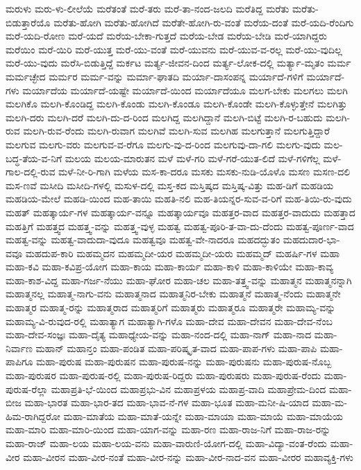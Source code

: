 {ಮರುಳು
ಮರು-ಳು-ಲೀಲೆಯೆ
ಮರೆತಂತೆ
ಮರೆ-ತರು
ಮರೆ-ತಾ-ನಂದ-ಜಲದಿ
ಮರೆತಿದ್ದ
ಮರೆತು
ಮರೆತು-ಬಿಡುತ್ತಾರೆಯೊ
ಮರೆತು-ಹೋಗಿ
ಮರೆತು-ಹೋಗಿದೆ
ಮರೆತೇ-ಹೋಗಿ-ರು-ವಂತೆ
ಮರೆಯ-ದಂತೆ
ಮರೆ-ಯದಿ-ರೆಂದಿಗು
ಮರೆ-ಯದಿ-ರೋಣ
ಮರೆ-ಯದೆ
ಮರೆಯ-ಬೇಕಾ-ಗುತ್ತದೆ
ಮರೆಯ-ಬೇಡ
ಮರೆಯ-ಬೇಡಿ
ಮರೆ-ಯಾಗಿದ್ದರು
ಮರೆಯಿಂ
ಮರೆ-ಯಿರಿ
ಮರೆ-ಯುತ್ತ
ಮರೆ-ಯು-ವಂತೆ
ಮರೆ-ಯುವನು
ಮರೆ-ಯುವ-ವ-ರಲ್ಲ
ಮರೆ-ಯು-ವುದಿಲ್ಲ
ಮರೆ-ಯು-ವುದು
ಮರೆಸಿ-ಬಿಡುತ್ತಿದ್ದೆ
ಮರ್ಕಟ
ಮರ್ತ್ಯ-ಜೀವನ-ದಿಂದ
ಮರ್ತ್ಯ-ಲೋಕ-ದಲ್ಲಿ
ಮರ್ತ್ಯಾ-ಮೃತಂ
ಮರ್ಮ
ಮರ್ಮಚ್ಛೇದ
ಮರ್ಮರ
ಮರ್ಮ-ವನ್ನು
ಮರ್ಮಾ-ಘಾತದಿ
ಮರ್ಯಾ-ದಾಸಂಪನ್ನ
ಮರ್ಯಾದೆ-ಗಳಿಗೆ
ಮರ್ಯಾದೆ-ಗಳು
ಮರ್ಯಾದೆಯ
ಮರ್ಯಾದೆ-ಯಷ್ಟೇ
ಮರ್ಯಾದೆ-ಯಿಂದ
ಮರ್ಯಾದೆಯೂ
ಮಲಗ-ಬೇಕು
ಮಲಗಲು
ಮಲಗಿ
ಮಲಗಿಕೊ
ಮಲಗಿ-ಕೊಂಡಿದ್ದ
ಮಲಗಿ-ಕೊಂಡು
ಮಲಗಿ-ಕೊಂಡೂ
ಮಲಗಿ-ಕೊಂಡೇ
ಮಲಗಿ-ಕೊಳ್ಳುತ್ತೇನೆ
ಮಲಗಿತ್ತು
ಮಲಗಿ-ದರು
ಮಲಗಿ-ದರೆ
ಮಲಗಿ-ದು-ದ-ರಿಂದ
ಮಲಗಿದ್ದ
ಮಲಗಿದ್ದಾನೆ
ಮಲಗಿ-ಬಿಟ್ಟೆ
ಮಲಗಿ-ರ-ಬಹುದು
ಮಲಗಿ-ರುವ
ಮಲಗಿ-ರುವ-ರೆಂದು
ಮಲಗಿ-ರುವಾಗ
ಮಲಗಿವೆ
ಮಲಗಿ-ಸುವ
ಮಲಗಿಹ
ಮಲಗುತ್ತಾನೆ
ಮಲಗುತ್ತಿದ್ದಾರೆ
ಮಲಗುವ
ಮಲಗು-ವರು
ಮಲಗುವ-ವ-ರೆಗೂ
ಮಲಗು-ವು-ದ-ರಿಂದ
ಮಲಗುವು-ದಾ-ಗಲಿ
ಮಲಗು-ವುದು
ಮಲ-ಬದ್ಧ-ತೆಯ-ವ-ನಿಗೆ
ಮಲಯ
ಮಲಯ-ಮಾರುತನ
ಮಳೆ
ಮಳೆ-ಗರಿ
ಮಳೆ-ಗರೆ-ಯುತ-ಲಿದೆ
ಮಳೆ-ಗಳಿಗೆಲ್ಲ
ಮಳೆ-ಗಾಲ-ದಲ್ಲಿ-ರುವ
ಮಳೆ-ನೀ-ರಿ-ಗಾಗಿ
ಮಳೆಯ
ಮಸ-ಕಾ-ದರೂ
ಮಸಕು
ಮಸಕು-ನುಡಿ-ಯೊಳೊ
ಮಸಣ
ಮಸಣ-ದಲಿ
ಮಸ-ಣವೆ
ಮಸೀದಿ
ಮಸೀದಿ-ಗಳಲ್ಲಿ
ಮಸುಳ-ದಲ್ಲಿ
ಮಸ್ತ-ಕದ
ಮಸ್ತಿಷ್ಕದ
ಮಸ್ತಿಷ್ಕ-ವಿತ್ತು
ಮಹ-ಡಿಗೆ
ಮಹಡಿಯ
ಮಹಡಿಯ-ಮೇಲೆ
ಮಹಡಿ-ಯಿಂದ
ಮಹ-ತಾಯಿ
ಮಹತಿ-ನಲಿ
ಮಹ-ತಿಯನ್ನರ-ಸುವ-ವ-ರಿಗೆ
ಮಹ-ತಿಯಿ-ರು-ವುದು
ಮಹತ್
ಮಹತ್ಕಾರ್ಯ-ಗಳ
ಮಹತ್ಕಾರ್ಯ-ವನ್ನೂ
ಮಹತ್ಕಾರ್ಯವೂ
ಮಹತ್ತರ-ವಾದ
ಮಹತ್ತರ-ವಾದುದು
ಮಹತ್ತಾದ
ಮಹತ್ತಿಗೆ
ಮಹತ್ತ್ವದ
ಮಹತ್ತ್ವ-ವನ್ನು
ಮಹತ್ತ್ವ-ವುಳ್ಳ
ಮಹತ್ವ
ಮಹತ್ವ-ಪೂರಿ-ತ-ವಾ-ದು-ದೆಂದು
ಮಹತ್ವ-ಪೂರ್ಣ-ವಾದ
ಮಹತ್ವ-ವನ್ನು
ಮಹತ್ವ-ವಾದುದಾ-ವುದೂ
ಮಹತ್ವವೂ
ಮಹತ್ವ-ವೇ-ನಾದರೂ
ಮಹದದ್ಭುತಂ
ಮಹದುದಾರ-ಭಾ-ವವೂ
ಮಹದುಪ-ಕಾರಿ
ಮಹಮ್ಮದನ
ಮಹಮ್ಮದೀ-ಯರ
ಮಹಮ್ಮದೀ-ಯರು
ಮಹಮ್ಮದ್
ಮಹರ್ಷಿ-ಗಳ
ಮಹಾ
ಮಹಾ-ಕವಿ
ಮಹಾ-ಕವಿಪ್ರ-ಯೋಗ
ಮಹಾ-ಕಾಯ
ಮಹಾ-ಕಾರ್ಯ
ಮಹಾ-ಕಾಳಿ
ಮಹಾ-ಕಾಳಿಯೇ
ಮಹಾ-ಕಾವ್ಯ
ಮಹಾ-ಕಾಶ-ವಿದ್ದ
ಮಹಾ-ಗರ್ಜ-ನೆಯು
ಮಹಾ-ಘೋರ
ಮಹಾ-ಚಲ
ಮಹಾ-ತತ್ತ್ವ-ವನ್ನು
ಮಹಾತ್ಮನ
ಮಹಾತ್ಮನನ್ನಾಗಿ
ಮಹಾತ್ಮನಲ್ಲ
ಮಹಾತ್ಮ-ನಾಗು-ವನು
ಮಹಾತ್ಮನಾದ
ಮಹಾತ್ಮನಿರ-ಬೇಕು
ಮಹಾತ್ಮನೆ
ಮಹಾತ್ಮ-ನೆಂದು
ಮಹಾತ್ಮನೇ
ಮಹಾತ್ಮರ
ಮಹಾತ್ಮ-ರನ್ನು
ಮಹಾತ್ಮರಾದ
ಮಹಾತ್ಮರಿಗೆ
ಮಹಾತ್ಮರು
ಮಹಾತ್ಮರೂ
ಮಹಾತ್ಮರೇ
ಮಹಾಮ್ಯ-ವನ್ನು
ಮಹಾಮ್ಯ-ವಿ-ರುವುದ-ರಲ್ಲಿ
ಮಹಾತ್ಯಾಗ
ಮಹಾತ್ಯಾಗಿ-ಗಳೊ
ಮಹಾ-ದೇವ
ಮಹಾ-ದೇವನ
ಮಹಾ-ದೇವ-ನೆಂಬ
ಮಹಾ-ದೇವ-ಸಂಜ್ಞಃ
ಮಹಾ-ದೈತ್ಯ
ಮಹಾಧ್ಯೇಯ-ವನ್ನು
ಮಹಾ-ನಂದ-ದಲ್ಲಿ
ಮಹಾ-ನಾಗ್
ಮಹಾ-ನಾದ
ಮಹಾ-ನಿರ್ವಾಣ
ಮಹಾನ್
ಮಹಾನ್ತಂ
ಮಹಾ-ಪಂಡಿತ
ಮಹಾ-ಪರಿಷ್ಕೃತ-ವಾದ
ಮಹಾ-ಪಾಪ-ಗಳು
ಮಹಾ-ಪಾಪಿ
ಮಹಾ-ಪಾಪಿಗೂ
ಮಹಾ-ಪುರುಷ
ಮಹಾ-ಪುರುಷನ
ಮಹಾ-ಪುರುಷ-ನನ್ನು
ಮಹಾ-ಪುರುಷನು
ಮಹಾ-ಪುರುಷ-ನೊಬ್ಬ
ಮಹಾ-ಪುರುಷರ
ಮಹಾ-ಪುರುಷ-ರಲ್ಲಿ
ಮಹಾ-ಪುರುಷ-ರಿದ್ದರು
ಮಹಾ-ಪುರುಷರು
ಮಹಾ-ಪುರುಷ-ರೆಂದು
ಮಹಾ-ಪುರುಷ-ರೆಲ್ಲಾ
ಮಹಾಪ್ರತಿ-ಭೆ-ಯಿಂದ
ಮಹಾಪ್ರಭು-ವಿನ
ಮಹಾಪ್ರಳಯ
ಮಹಾಪ್ರ-ವಾದಿ
ಮಹಾಪ್ರೇಮ-ದಿಂದ
ಮಹಾ-ಬೀಜ
ಮಹಾ-ಭಾರತ
ಮಹಾ-ಭಾರ-ತದ
ಮಹಾ-ಭಾವ-ನೆ-ಗಳ
ಮಹಾ-ಭೂತ
ಮಹಾ-ಮನೀ-ಷಿ-ಯಾದ
ಮಹಾ-ಮ-ಹಿಮ-ರಾಗಿದ್ದರೋ
ಮಹಾ-ಮಾತೆಯ
ಮಹಾ-ಮಾತೆ-ಯನ್ನೇ
ಮಹಾ-ಮಾಯಾ
ಮಹಾ-ಮಾಯೆ
ಮಹಾ-ಮಾಯೆಯ
ಮಹಾ-ಮಾರಿ
ಮಹಾ-ಮಾರಿ-ಯಿಂದ
ಮಹಾ-ಯಾಗ-ವನ್ನು
ಮಹಾ-ರಣ
ಮಹಾ-ರಾಜ-ನಿಗೆ
ಮಹಾ-ರಾಜ-ರನ್ನು
ಮಹಾ-ರಾಜ್
ಮಹಾ-ಲಯ
ಮಹಾ-ಲಯ-ವನು
ಮಹಾ-ವಾರುಣಿ-ಯೋಗ-ದಲ್ಲಿ
ಮಹಾ-ವಿದ್ಯಾ-ವಂತ-ರೆಂದು
ಮಹಾ-ವೀರ
ಮಹಾ-ವೀರನ
ಮಹಾ-ವೀರ-ನಂತೆ
ಮಹಾ-ವೀರ-ನನ್ನು
ಮಹಾ-ವೀರ-ನಾದ-ವನ
ಮಹಾ-ವೀರರ
ಮಹಾವ್ಯಕ್ತಿ-ಗಳು
}
